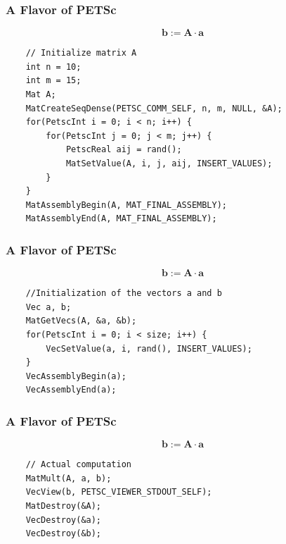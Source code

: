 \documentclass[compress]{beamer}
\begin{document}
\begin{frame}[fragile]
\frametitle{A Flavor of PETSc}
$$
	\mathbf{b} := \mathbf{A} \cdot \mathbf{a}
$$
\begin{lstlisting}
    // Initialize matrix A
    int n = 10;
    int m = 15;
    Mat A;
    MatCreateSeqDense(PETSC_COMM_SELF, n, m, NULL, &A);
    for(PetscInt i = 0; i < n; i++) {
        for(PetscInt j = 0; j < m; j++) {
            PetscReal aij = rand();
            MatSetValue(A, i, j, aij, INSERT_VALUES);
        }
    }
    MatAssemblyBegin(A, MAT_FINAL_ASSEMBLY);
    MatAssemblyEnd(A, MAT_FINAL_ASSEMBLY);
\end{lstlisting}

\end{frame}

\begin{frame}[fragile]
\frametitle{A Flavor of PETSc}
$$
	\mathbf{b} := \mathbf{A} \cdot \mathbf{a}
$$
\begin{lstlisting}
    //Initialization of the vectors a and b
    Vec a, b;
    MatGetVecs(A, &a, &b);
    for(PetscInt i = 0; i < size; i++) {
        VecSetValue(a, i, rand(), INSERT_VALUES);
    }
    VecAssemblyBegin(a);
    VecAssemblyEnd(a);
\end{lstlisting}

\end{frame}

\begin{frame}[fragile]
\frametitle{A Flavor of PETSc}
$$
	\mathbf{b} := \mathbf{A} \cdot \mathbf{a}
$$
\begin{lstlisting}
    // Actual computation
    MatMult(A, a, b);
    VecView(b, PETSC_VIEWER_STDOUT_SELF);
    MatDestroy(&A);
    VecDestroy(&a);
    VecDestroy(&b);
\end{lstlisting}

\end{frame}
\end{document}
